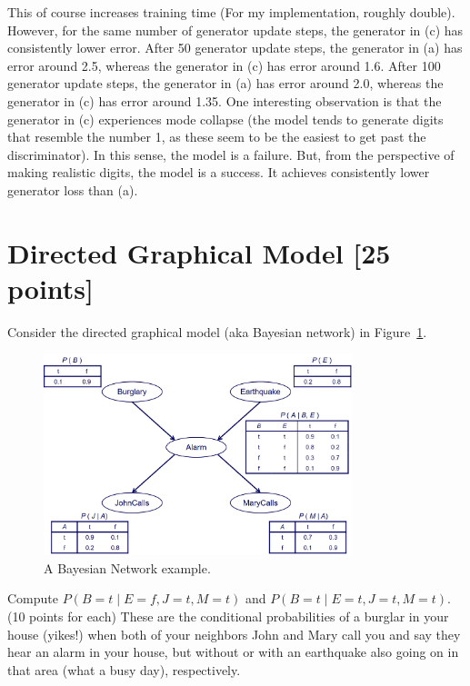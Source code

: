 \documentclass[a4paper]{article}
\theoremstyle{definition}
\newenvironment{soln}{
	\leavevmode\color{blue}\ignorespaces
}{}
\begin{document}
\begin{enumerate} [label=(\alph*)]
\begin{soln}
                This of course increases training time (For my implementation, roughly double). However, for the same number of generator update steps, the generator in (c) has consistently lower error. After 50 generator update steps, the generator in (a) has error around 2.5, whereas the generator in (c) has error around 1.6. After 100 generator update steps, the generator in (a) has error around 2.0, whereas the generator in (c) has error around 1.35.
                One interesting observation is that the generator in (c) experiences mode collapse (the model tends to generate digits that resemble the number 1, as these seem to be the easiest to get past the discriminator). In this sense, the model is a failure. But, from the perspective of making realistic digits, the model is a success. It achieves consistently lower generator loss than (a).
      
            \end{soln}
		
	\end{enumerate}

\newpage

\section{Directed Graphical Model [25 points]}
Consider the directed graphical model (aka Bayesian network) in Figure~\ref{fig:bn}.
\begin{figure}[H]
    \centering
    \includegraphics[width=0.8\textwidth]{BN.jpeg}
    \caption{A Bayesian Network example.}
    \label{fig:bn}
\end{figure}
Compute $P(B=t \mid E=f,J=t,M=t)$ and $P(B=t \mid E=t,J=t,M=t)$. (10 points for each) These are the conditional probabilities of a burglar in your house (yikes!) when both of your neighbors John and Mary call you and say they hear an alarm in your house, but without or with an earthquake also going on in that area (what a busy day), respectively.
\end{document}
